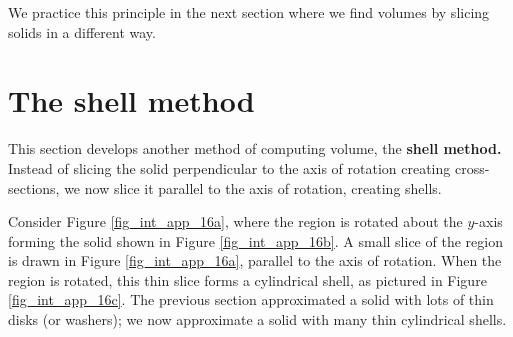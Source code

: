 We practice this principle in the next section where we find volumes by slicing solids in a different way.

\section{The shell method}\label{sec:shell_method}
This section develops another method of computing volume, the \textbf{shell method.} Instead of slicing the solid perpendicular to the axis of rotation creating cross-sections, we now slice it parallel to the axis of rotation, creating shells.

\checkoddpage
{}
Consider Figure \ref{fig_int_app_16a}, where the region is rotated about the $y$-axis forming the solid shown in  Figure \ref{fig_int_app_16b}. A small slice of the region is drawn in  Figure \ref{fig_int_app_16a}, parallel to the axis of rotation. When the region is rotated, this thin slice forms a cylindrical shell, as pictured in Figure \ref{fig_int_app_16c}. The previous section approximated a solid with lots of thin disks (or washers); we now approximate a solid with many thin cylindrical shells. 

